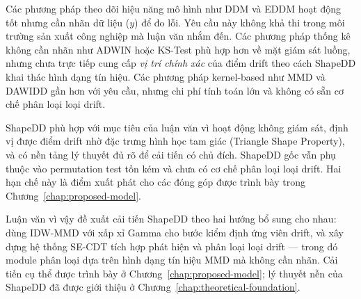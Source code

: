 Các phương pháp theo dõi hiệu năng mô hình như DDM và EDDM hoạt động tốt nhưng cần nhãn dữ liệu ($y$) để đo lỗi. Yêu cầu này không khả thi trong môi trường sản xuất công nghiệp mà luận văn nhắm đến. Các phương pháp thống kê không cần nhãn như ADWIN hoặc KS-Test phù hợp hơn về mặt giám sát luồng, nhưng chưa trực tiếp cung cấp \textit{vị trí chính xác} của điểm drift theo cách ShapeDD khai thác hình dạng tín hiệu. Các phương pháp kernel-based như MMD và DAWIDD gần hơn với yêu cầu, nhưng chi phí tính toán lớn và không có sẵn cơ chế phân loại loại drift.

ShapeDD phù hợp với mục tiêu của luận văn vì hoạt động không giám sát, định vị được điểm drift nhờ đặc trưng hình học tam giác (Triangle Shape Property), và có nền tảng lý thuyết đủ rõ để cải tiến có chủ đích. ShapeDD gốc vẫn phụ thuộc vào permutation test tốn kém và chưa có cơ chế phân loại loại drift. Hai hạn chế này là điểm xuất phát cho các đóng góp được trình bày trong Chương~\ref{chap:proposed-model}.

Luận văn vì vậy đề xuất cải tiến ShapeDD theo hai hướng bổ sung cho nhau: dùng IDW-MMD với xấp xỉ Gamma cho bước kiểm định ứng viên drift, và xây dựng hệ thống SE-CDT tích hợp phát hiện và phân loại loại drift --- trong đó module phân loại dựa trên hình dạng tín hiệu MMD mà không cần nhãn. Cải tiến cụ thể được trình bày ở Chương~\ref{chap:proposed-model}; lý thuyết nền của ShapeDD đã được giới thiệu ở Chương~\ref{chap:theoretical-foundation}.
